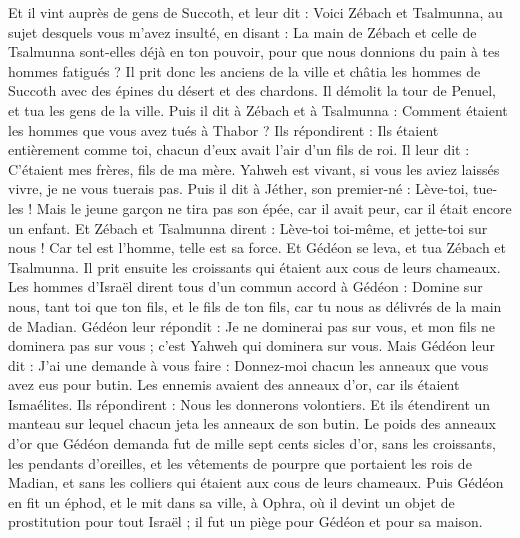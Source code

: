 \begin{multicols}{2}
Et il vint auprès de gens de Succoth, et leur dit : Voici Zébach et Tsalmunna, au sujet desquels vous m'avez insulté, en disant : La main de Zébach et celle de Tsalmunna sont-elles déjà en ton pouvoir, pour que nous donnions du pain à tes hommes fatigués ?
Il prit donc les anciens de la ville et châtia les hommes de Succoth avec des épines du désert et des chardons.
Il démolit la tour de Penuel, et tua les gens de la ville.
Puis il dit à Zébach et à Tsalmunna : Comment étaient les hommes que vous avez tués à Thabor ? Ils répondirent : Ils étaient entièrement comme toi, chacun d'eux avait l'air d'un fils de roi.
Il leur dit : C'étaient mes frères, fils de ma mère. Yahweh est vivant, si vous les aviez laissés vivre, je ne vous tuerais pas.
Puis il dit à Jéther, son premier-né : Lève-toi, tue-les ! Mais le jeune garçon ne tira pas son épée, car il avait peur, car il était encore un enfant.
Et Zébach et Tsalmunna dirent : Lève-toi toi-même, et jette-toi sur nous ! Car tel est l'homme, telle est sa force. Et Gédéon se leva, et tua Zébach et Tsalmunna. Il prit ensuite les croissants qui étaient aux cous de leurs chameaux.
Les hommes d'Israël dirent tous d'un commun accord à Gédéon : Domine sur nous, tant toi que ton fils, et le fils de ton fils, car tu nous as délivrés de la main de Madian.
Gédéon leur répondit : Je ne dominerai pas sur vous, et mon fils ne dominera pas sur vous ; c'est Yahweh qui dominera sur vous.
Mais Gédéon leur dit : J’ai une demande à vous faire : Donnez-moi chacun les anneaux que vous avez eus pour butin. Les ennemis avaient des anneaux d'or, car ils étaient Ismaélites.
Ils répondirent : Nous les donnerons volontiers. Et ils étendirent un manteau sur lequel chacun jeta les anneaux de son butin.
Le poids des anneaux d'or que Gédéon demanda fut de mille sept cents sicles d'or, sans les croissants, les pendants d'oreilles, et les vêtements de pourpre que portaient les rois de Madian, et sans les colliers qui étaient aux cous de leurs chameaux.
Puis Gédéon en fit un  éphod, et le mit dans sa ville, à Ophra, où il devint un objet de prostitution pour tout Israël ; il fut un piège pour Gédéon et pour sa maison.

\end{multicols}
